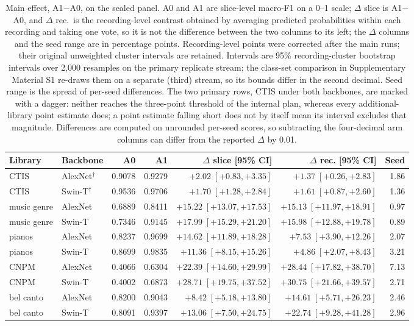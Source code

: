 \begin{table}[t]
\centering
\caption{Main effect, A1$-$A0, on the sealed panel. A0 and A1 are slice-level macro-F1 on a 0--1
scale; $\Delta$ slice is A1$-$A0, and $\Delta$ rec.\ is the recording-level contrast obtained by
averaging predicted probabilities within each recording and taking one vote, so it is not the
difference between the two columns to its left; the $\Delta$ columns and the
seed range are in percentage points. Recording-level points were corrected after the main runs;
their original unweighted cluster intervals are retained. Intervals are 95\% recording-cluster
bootstrap intervals over 2{,}000 resamples on the primary replicate stream; the class-set
comparison in Supplementary Material S1 re-draws them on a separate (third) stream, so its bounds
differ in the second decimal. Seed range is the spread of per-seed differences. The two primary rows, CTIS under both backbones, are marked with a dagger:
neither reaches the three-point threshold of the internal plan, whereas every additional-library
point estimate does; a point estimate falling short does not by itself mean its interval
excludes that magnitude. Differences
are computed on unrounded per-seed scores, so subtracting the four-decimal arm columns can differ
from the reported $\Delta$ by 0.01.}
\label{tab:main}
\scriptsize
\setlength{\tabcolsep}{1.5pt}
\begin{tabular}{l@{\hspace{3pt}}lrrrrr}
\toprule
Library & Backbone & A0 & A1 & $\Delta$ slice [95\% CI] & $\Delta$ rec. [95\% CI] & Seed \\
\midrule
CTIS        & AlexNet$^{\dagger}$ & 0.9078 & 0.9279 & $+2.02\;[+0.83,+3.35]$ & $+1.37\;[+0.26,+2.83]$ & 1.86 \\
CTIS        & Swin-T$^{\dagger}$  & 0.9536 & 0.9706 & $+1.70\;[+1.28,+2.84]$ & $+1.61\;[+0.87,+2.60]$ & 1.36 \\
music genre& AlexNet & 0.6889 & 0.8411 & $+15.22\;[+13.07,+17.53]$ & $+15.13\;[+11.97,+18.91]$ & 0.97 \\
music genre& Swin-T  & 0.7346 & 0.9145 & $+17.99\;[+15.29,+21.20]$ & $+15.98\;[+12.88,+19.78]$ & 0.89 \\
pianos      & AlexNet & 0.8237 & 0.9699 & $+14.62\;[+11.89,+18.28]$ & $+7.53\;[+3.90,+12.26]$ & 2.07 \\
pianos      & Swin-T  & 0.8699 & 0.9835 & $+11.36\;[+8.15,+15.26]$ & $+4.86\;[+2.07,+8.43]$ & 3.21 \\
CNPM        & AlexNet & 0.4066 & 0.6304 & $+22.39\;[+14.60,+29.99]$ & $+28.44\;[+17.82,+38.70]$ & 7.13 \\
CNPM        & Swin-T  & 0.4002 & 0.6873 & $+28.71\;[+19.75,+37.52]$ & $+30.75\;[+21.66,+39.57]$ & 2.71 \\
bel canto & AlexNet & 0.8200 & 0.9043 & $+8.42\;[+5.18,+13.80]$ & $+14.61\;[+5.71,+26.23]$ & 2.46 \\
bel canto & Swin-T  & 0.8091 & 0.9397 & $+13.06\;[+7.50,+24.75]$ & $+22.74\;[+9.28,+41.28]$ & 2.96 \\
\bottomrule
\end{tabular}
\end{table}

